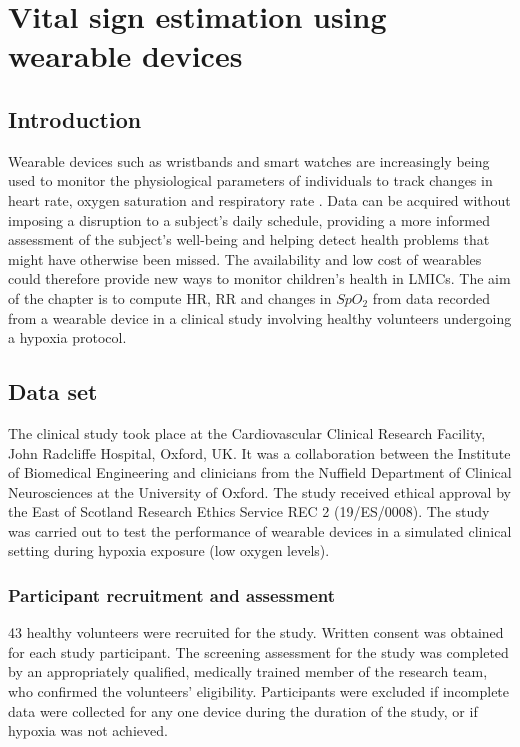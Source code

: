 \chapter{Vital sign estimation using wearable devices}

\label{chapter:PPG signal Processing} 

\section{Introduction}

Wearable devices such as wristbands and smart watches are increasingly being used to monitor the physiological parameters of individuals to track changes in heart rate, oxygen saturation and respiratory rate \cite{castaneda2018review}. Data can be acquired without imposing a disruption to a subject's daily schedule, providing a more informed assessment of the subject's well-being and helping detect health problems that might have otherwise been missed. The availability and low cost of wearables could therefore provide new ways to monitor children's health in LMICs. The aim of the chapter is to compute HR, RR and changes in $SpO_2$ from data recorded from a wearable device in a clinical study involving healthy volunteers undergoing a hypoxia protocol. 


\section{Data set}

The clinical study took place at the Cardiovascular Clinical Research Facility, John Radcliffe Hospital, Oxford, UK. It was a collaboration between the Institute of Biomedical Engineering and clinicians from the Nuffield Department of Clinical Neurosciences at the University of Oxford. The study received ethical approval by the East of Scotland Research Ethics Service REC 2 (19/ES/0008). The study was carried out to test the performance of wearable devices in a simulated clinical setting during hypoxia exposure (low oxygen levels).  

\subsection{Participant recruitment and assessment}

43 healthy volunteers were recruited for the study. Written consent was obtained for each study participant. The screening assessment for the study was completed by an appropriately qualified, medically trained member of the research team, who confirmed the volunteers' eligibility. Participants were excluded if incomplete data were collected for any one device during the duration of the study, or if hypoxia was not achieved.

